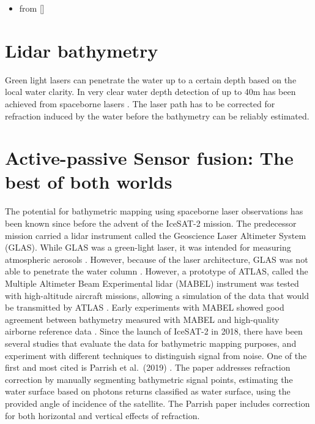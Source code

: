 \begin{itemize}

      \item from {[}{]}
\end{itemize}


\section{Lidar bathymetry}

Green light lasers can penetrate the water up to a certain depth based on the local water clarity. In very clear water depth detection of up to 40m has been achieved from spaceborne lasers \cite{Parrish2019}. The laser path has to be corrected for refraction induced by the water before the bathymetry can be reliably estimated.

\section{Active-passive Sensor fusion: The best of both worlds}

The potential for bathymetric mapping using spaceborne laser observations has been known since before the advent of the IceSAT-2 mission. The predecessor mission carried a lidar instrument called the Geoscience Laser Altimeter System (GLAS). While GLAS was a green-light laser, it was intended for measuring atmospheric aerosols \cite{Abshire2005}. However, because of the laser architecture, GLAS was not able to penetrate the water column \cite{Forfinski-Sarkozi2016}. However, a prototype of ATLAS, called the Multiple Altimeter Beam Experimental lidar (MABEL) instrument was tested with high-altitude aircraft missions, allowing a simulation of the data that would be transmitted by ATLAS \cite{Mcgill2013}. Early experiments with MABEL showed good agreement between bathymetry measured with MABEL and high-quality airborne reference data \cite{Jasinski2016,Forfinski-Sarkozi2016}. Since the launch of IceSAT-2 in 2018, there have been several studies that evaluate the data for bathymetric mapping purposes, and experiment with different techniques to distinguish signal from noise. One of the first and most cited is Parrish et al.~(2019) \cite{Parrish2019}. The paper addresses refraction correction by manually segmenting bathymetric signal points, estimating the water surface based on photons returns classified as water surface, using the provided angle of incidence of the satellite. The Parrish paper includes correction for both horizontal and vertical effects of refraction.

